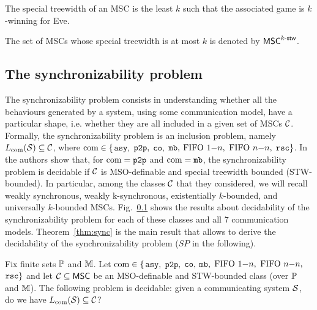 \newcommand{\CS}[2]{\mathsf{CS}_{(#1,#2)}}
\newcommand{\MSO}[2]{\mathsf{MSO}_{(#1,#2)}}
\newcommand{\LCPDL}[2]{\mathsf{LCPDL}_{(#1,#2)}}
\newcommand{\MSCpm}[2]{\mathsf{MSC}_{(#1,#2)}}
\newcommand{\mbMSCpm}[2]{\mathsf{MSC}_{(#1,#2)}^{\mathsf{mb}}}


\begin{fact}
	The special treewidth of an MSC is the least $k$ such that
	the associated game is $k$-winning for Eve.
\end{fact}

The set of MSCs whose special treewidth is at most $k$ is denoted by $\mathsf{MSC}^{k\textup{-}\mathsf{stw}}$.

\subsection{The synchronizability problem}

The synchronizability problem consists in understanding whether all the behaviours generated by a system, using some communication model, have a particular shape, i.e.  whether they are all included in a given set of MSCs $\mathcal{C}$. Formally, the synchronizability problem is an inclusion problem, namely $L_{\textup{com}}(\mathcal{S}) \subseteq \mathcal{C}$, where $\textup{com} \in \{$$\mathtt{asy}, $ $\mathtt{p2p}, $ $\mathtt{co}, $ $\mathtt{mb}, $ $\text{FIFO } 1\mathsf{-}n, $ $\text{FIFO } n\mathsf{-}n, $ $\mathtt{rsc}\}$. In \cite{BolligFG21} the authors show that, for $\textup{com} = \mathtt{p2p}$ and $\textup{com} = \mathtt{mb}$, the synchronizability problem is decidable if $\mathcal{C}$ is MSO-definable and special treewidth bounded (STW-bounded). In particular, among the classes $\mathcal{C}$ that they considered, we will recall weakly synchronous, weakly k-synchronous, existentially $k$-bounded, and universally $k$-bounded MSCs. Fig.~\ref{} shows the results about decidability of the synchronizability problem for each of these classes and all 7 communication models. Theorem~\ref{thm:sync} is the main result that allows to derive the decidability of the synchronizability problem ($SP$ in the following).

\begin{theorem}\label{thm:sync}
	Fix finite sets $\mathbb{P}$ and $\mathbb{M}$.
	Let $\textup{com} \in \{$$\mathtt{asy}, $ $\mathtt{p2p}, $ $\mathtt{co}, $ $\mathtt{mb}, $ $\text{FIFO } 1\mathsf{-}n, $ $\text{FIFO } n\mathsf{-}n, $ $\mathtt{rsc}\}$ and let $\mathcal{C} \subseteq \mathsf{MSC}$ be an MSO-definable and STW-bounded class (over $\mathbb{P}$ and $\mathbb{M}$).
	The following problem is decidable:
	given a communicating system $\mathcal{S}$, do we have $L_{\textup{com}}(\mathcal{S}) \subseteq \mathcal{C}$?
\end{theorem}

